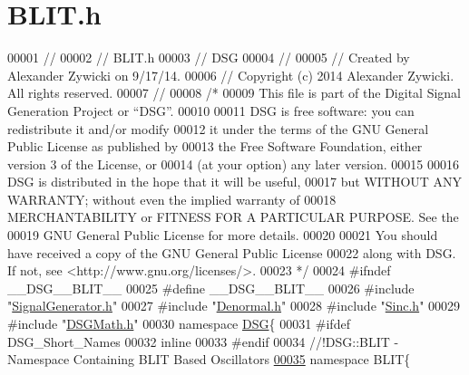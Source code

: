 \hypertarget{_b_l_i_t_8h_source}{\section{B\+L\+I\+T.\+h}
\label{_b_l_i_t_8h_source}
}

\begin{DoxyCode}
00001 \textcolor{comment}{//}
00002 \textcolor{comment}{//  BLIT.h}
00003 \textcolor{comment}{//  DSG}
00004 \textcolor{comment}{//}
00005 \textcolor{comment}{//  Created by Alexander Zywicki on 9/17/14.}
00006 \textcolor{comment}{//  Copyright (c) 2014 Alexander Zywicki. All rights reserved.}
00007 \textcolor{comment}{//}
00008 \textcolor{comment}{/*}
00009 \textcolor{comment}{ This file is part of the Digital Signal Generation Project or “DSG”.}
00010 \textcolor{comment}{}
00011 \textcolor{comment}{ DSG is free software: you can redistribute it and/or modify}
00012 \textcolor{comment}{ it under the terms of the GNU General Public License as published by}
00013 \textcolor{comment}{ the Free Software Foundation, either version 3 of the License, or}
00014 \textcolor{comment}{ (at your option) any later version.}
00015 \textcolor{comment}{}
00016 \textcolor{comment}{ DSG is distributed in the hope that it will be useful,}
00017 \textcolor{comment}{ but WITHOUT ANY WARRANTY; without even the implied warranty of}
00018 \textcolor{comment}{ MERCHANTABILITY or FITNESS FOR A PARTICULAR PURPOSE.  See the}
00019 \textcolor{comment}{ GNU General Public License for more details.}
00020 \textcolor{comment}{}
00021 \textcolor{comment}{ You should have received a copy of the GNU General Public License}
00022 \textcolor{comment}{ along with DSG.  If not, see <http://www.gnu.org/licenses/>.}
00023 \textcolor{comment}{ */}
00024 \textcolor{preprocessor}{#ifndef \_\_DSG\_\_BLIT\_\_}
00025 \textcolor{preprocessor}{#define \_\_DSG\_\_BLIT\_\_}
00026 \textcolor{preprocessor}{#include "\hyperlink{_signal_generator_8h}{SignalGenerator.h}"}
00027 \textcolor{preprocessor}{#include "\hyperlink{_denormal_8h}{Denormal.h}"}
00028 \textcolor{preprocessor}{#include "\hyperlink{_sinc_8h}{Sinc.h}"}
00029 \textcolor{preprocessor}{#include "\hyperlink{_d_s_g_math_8h}{DSGMath.h}"}
00030 \textcolor{keyword}{namespace }\hyperlink{namespace_d_s_g}{DSG}\{
00031 \textcolor{preprocessor}{#ifdef DSG\_Short\_Names}
00032     \textcolor{keyword}{inline}
00033 \textcolor{preprocessor}{#endif}
00034 \textcolor{comment}{    //!DSG::BLIT - Namespace Containing BLIT Based Oscillators}
\hypertarget{_b_l_i_t_8h_source_l00035}{}\hyperlink{namespace_d_s_g_1_1_b_l_i_t}{00035} \textcolor{comment}{}    \textcolor{keyword}{namespace }BLIT\{\textcolor{comment}{}

\end{DoxyCode}
